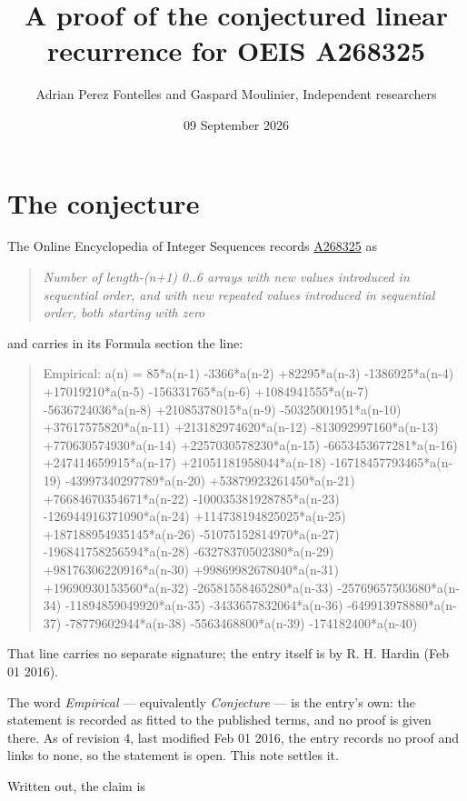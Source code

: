 \documentclass[11pt]{article}
\title{A proof of the conjectured linear recurrence for OEIS A268325}
\author{Adrian Perez Fontelles and Gaspard Moulinier, Independent researchers}
\date{09 September 2026}
\theoremstyle{definition}
\begin{document}
\maketitle
\section{The conjecture}

The Online Encyclopedia of Integer Sequences records \href{https://oeis.org/A268325}{A268325} as

\begin{quote}\itshape Number of length-(n+1) 0..6 arrays with new values introduced in sequential order, and with new repeated values introduced in sequential order, both starting with zero\end{quote}

and carries in its Formula section the line:

\begin{quote}\ttfamily Empirical: a(n) = 85*a(n-1) -3366*a(n-2) +82295*a(n-3) -1386925*a(n-4) +17019210*a(n-5) -156331765*a(n-6) +1084941555*a(n-7) -5636724036*a(n-8) +21085378015*a(n-9) -50325001951*a(n-10) +37617575820*a(n-11) +213182974620*a(n-12) -813092997160*a(n-13) +770630574930*a(n-14) +2257030578230*a(n-15) -6653453677281*a(n-16) +247414659915*a(n-17) +21051181958044*a(n-18) -16718457793465*a(n-19) -43997340297789*a(n-20) +53879923261450*a(n-21) +76684670354671*a(n-22) -100035381928785*a(n-23) -126944916371090*a(n-24) +114738194825025*a(n-25) +187188954935145*a(n-26) -51075152814970*a(n-27) -196841758256594*a(n-28) -63278370502380*a(n-29) +98176306220916*a(n-30) +99869982678040*a(n-31) +19690930153560*a(n-32) -26581558465280*a(n-33) -25769657503680*a(n-34) -11894859049920*a(n-35) -3433657832064*a(n-36) -649913978880*a(n-37) -78779602944*a(n-38) -5563468800*a(n-39) -174182400*a(n-40)\end{quote}

That line carries no separate signature; the entry itself is by R. H. Hardin (Feb 01 2016).

The word {\itshape Empirical} --- equivalently {\itshape Conjecture} --- is the entry's own: the statement is recorded as fitted to the published terms, and no proof is given there. As of revision 4, last modified Feb 01 2016, the entry records no proof and links to none, so the statement is open. This note settles it.

Written out, the claim is
\end{document}
